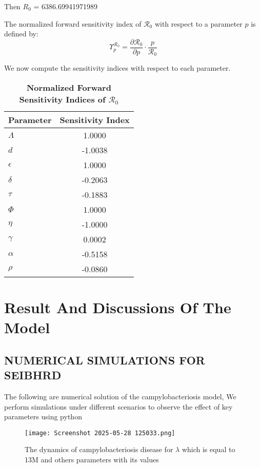 \documentclass[a4paper,12pt]{report}
\begin{document}
\begin{itemize}
Then $R_0$ = 6386.69941971989


The normalized forward sensitivity index of \( \mathcal{R}_0 \) with respect to a parameter \( p \) is defined by:
\[
\Upsilon_p^{\mathcal{R}_0} = \frac{\partial \mathcal{R}_0}{\partial p} \cdot \frac{p}{\mathcal{R}_0}
\]

We now compute the sensitivity indices with respect to each parameter.

\begin{table}[h!]
\centering
\caption{\textbf{Normalized Forward Sensitivity Indices of \( \mathcal{R}_0 \)}}
\label{tab:sensitivity_indices}
\begin{tabular}{l S}
\toprule
\textbf{Parameter} & {\textbf{Sensitivity Index}} \\
\midrule
$\Lambda$ & 1.0000 \\
$d$ & -1.0038 \\
$\epsilon$ & 1.0000 \\
$\delta$ & -0.2063 \\
$\tau$ & -0.1883 \\
$\Phi$ & 1.0000 \\
$\eta$ & -1.0000 \\
$\gamma$ & 0.0002 \\
$\alpha$ & -0.5158 \\
$\rho$ & -0.0860 \\
\bottomrule
\end{tabular}
\end{table}






\newpage
\chapter{Result And Discussions Of The Model }
\section{ NUMERICAL SIMULATIONS FOR SEIBHRD}


The following are numerical solution of the campylobacteriosis model, We perform simulations under different scenarios to observe the effect of key parameters using python\\

\begin{figure}[H]
    \centering
    \texttt{[image: Screenshot 2025-05-28 125033.png]}
    \caption{The dynamics of campylobacteriosis disease for $\lambda$ which is equal to 13M and others parameters with its values}
    \label{fig:enter-label}
\end{figure}


\end{itemize}
\end{document}
